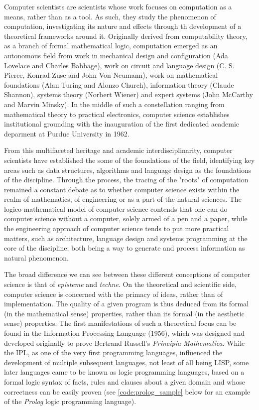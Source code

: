 Computer scientists are scientists whose work focuses on computation as a means, rather than as a tool. As such, they study the phenomenon of computation, investigating its nature and effects through th development of a theoretical frameworks around it. Originally derived from computability theory, as a branch of formal mathematical logic, computation emerged as an autonomous field from work in mechanical design and configuration (Ada Lovelace and Charles Babbage),  work on circuit and language design (C. S. Pierce, Konrad Zuse and John Von Neumann), work on mathematical foundations (Alan Turing and Alonzo Church), information theory (Claude Shannon), systems theory (Norbert Wiener) and expert systems (John McCarthy and Marvin Minsky)\cite{ifrah_universal_2001}. In the middle of such a constellation ranging from mathematical theory to practical electronics, computer science establishes institutional grounding with the inauguration of the first dedicated academic deparment at Purdue University in 1962.

From this multifaceted heritage and academic interdisciplinarity, computer scientists have established the some of the foundations of the field, identifying key areas such as data structures, algorithms and language design as the foundations of the discipline\cite{wirth_algorithms_1976}. Through the process, the tracing of the "roots" of computation remained a constant debate as to whether computer science exists within the realm of mathematics, of engineering or as a part of the natural sciences. The logico-mathematical model of computer science contends that one can do computer science without a computer, solely armed of a pen and a paper, while the engineering approach of computer science tends to put more practical matters, such as architecture, language design and systems programming at the core of the discipline; both being a way to generate and process information as natural phenomenon\cite{tedre_development_2006}.

The broad difference we can see between these different conceptions of computer science is that of \emph{episteme} and \emph{techne}. On the theoretical and scientific side, computer science is concerned with the primacy of ideas, rather than of implementation. The quality of a given program is thus deduced from its formal (in the mathematical sense) properties, rather than its formal (in the aesthetic sense) properties. The first manifestations of such a theoretical focus can be found in the Information Processing Language (1956), which was designed and developed originally to prove Bertrand Russell's \emph{Principia Mathematica}. While the IPL, as one of the very first programming languages, influenced the development of multiple subsequent languages, not least of all being LISP, some later languages came to be known as logic programming languages, based on a formal logic syntax of facts, rules and clauses about a given domain and whose correctness can be easily proven (see \ref{code:prolog_sample} below for an example of the \emph{Prolog} logic programming language).

